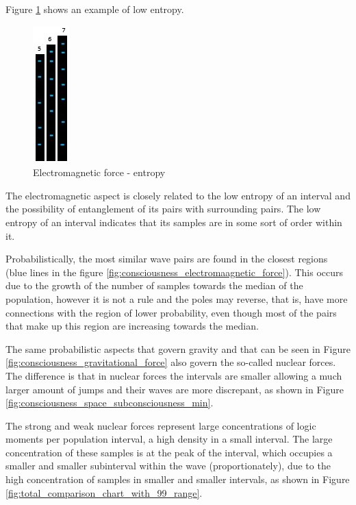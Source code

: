 Figure \ref{fig:consciousness_electromaagnetic_force_entropy} shows an example of low entropy.
	\begin{figure}[H]
	\caption{Electromagnetic force - entropy}
	\label{fig:consciousness_electromaagnetic_force_entropy}
	\centering
	\includegraphics[scale=.9]{sections/images/consciousness_electromaagnetic_force_entropy.jpg}
	\end{figure}

The electromagnetic aspect is closely related to the low entropy of an interval and the possibility of entanglement of its pairs with surrounding pairs. The low entropy of an interval indicates that its samples are in some sort of order within it.

Probabilistically, the most similar wave pairs are found in the closest regions (blue lines in the figure \ref{fig:consciousness_electromaagnetic_force}). This occurs due to the growth of the number of samples towards the median of the population, however it is not a rule and the poles may reverse, that is, have more connections with the region of lower probability, even though most of the pairs that make up this region are increasing towards the median.

The same probabilistic aspects that govern gravity and that can be seen in Figure \ref{fig:consciousness_gravitational_force} also govern the so-called nuclear forces. The difference is that in nuclear forces the intervals are smaller allowing a much larger amount of jumps and their waves are more discrepant, as shown in Figure \ref{fig:consciousness_space_subconsciousness_min}.

The strong and weak nuclear forces represent large concentrations of logic moments per population interval, a high density in a small interval. The large concentration of these samples is at the peak of the interval, which occupies a smaller and smaller subinterval within the wave (proportionately), due to the high concentration of samples in smaller and smaller intervals, as shown in Figure \ref{fig:total_comparison_chart_with_99_range}.

